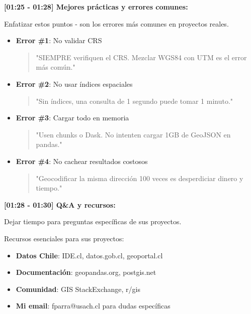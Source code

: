 \documentclass[11pt,a4paper]{article}
\begin{document}
\textbf{[01:25 - 01:28] Mejores prácticas y errores comunes:}

\begin{alertbox}
Enfatizar estos puntos - son los errores más comunes en proyectos reales.
\end{alertbox}

\begin{itemize}
    \item \textbf{Error \#1}: No validar CRS
    \begin{quote}
        "SIEMPRE verifiquen el CRS. Mezclar WGS84 con UTM es el error más común."
    \end{quote}
    
    \item \textbf{Error \#2}: No usar índices espaciales
    \begin{quote}
        "Sin índices, una consulta de 1 segundo puede tomar 1 minuto."
    \end{quote}
    
    \item \textbf{Error \#3}: Cargar todo en memoria
    \begin{quote}
        "Usen chunks o Dask. No intenten cargar 1GB de GeoJSON en pandas."
    \end{quote}
    
    \item \textbf{Error \#4}: No cachear resultados costosos
    \begin{quote}
        "Geocodificar la misma dirección 100 veces es desperdiciar dinero y tiempo."
    \end{quote}
\end{itemize}

\textbf{[01:28 - 01:30] Q\&A y recursos:}

\begin{tipbox}
Dejar tiempo para preguntas específicas de sus proyectos.
\end{tipbox}

Recursos esenciales para sus proyectos:
\begin{itemize}
    \item \textbf{Datos Chile}: IDE.cl, datos.gob.cl, geoportal.cl
    \item \textbf{Documentación}: geopandas.org, postgis.net
    \item \textbf{Comunidad}: GIS StackExchange, r/gis
    \item \textbf{Mi email}: fparra@usach.cl para dudas específicas
\end{itemize}
\end{document}

